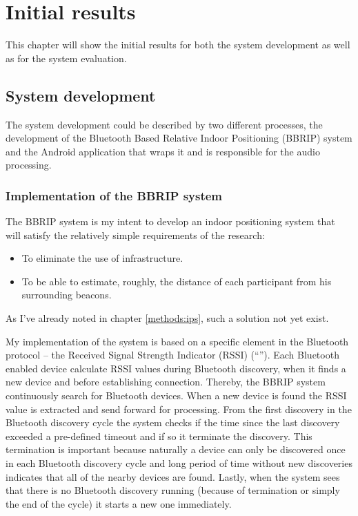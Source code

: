 \section{Initial results}

This chapter will show the initial results for both the system development as well as for the system evaluation.

\subsection{System development}

The system development could be described by two different processes, the development of the Bluetooth Based Relative Indoor Positioning (BBRIP) system and the Android application that wraps it and is responsible for the audio processing.

\subsubsection{Implementation of the BBRIP system}

The BBRIP system is my intent to develop an indoor positioning system that will satisfy the relatively simple requirements of the research:
\begin{itemize}
	\item To eliminate the use of infrastructure.
	\item To be able to estimate, roughly, the distance of each participant from his surrounding beacons.
\end{itemize}

As I've already noted in chapter \ref{methods:ips}, such a solution not yet exist.

My implementation of the system is based on a specific element in the Bluetooth protocol -- the Received Signal Strength Indicator (RSSI) (``''). Each Bluetooth enabled device calculate RSSI values during Bluetooth discovery, when it finds a new device and before establishing connection. Thereby, the BBRIP system continuously search for Bluetooth devices. When a new device is found the RSSI value is extracted and send forward for processing. From the first discovery in the Bluetooth discovery cycle the system checks if the time since the last discovery exceeded a pre-defined timeout and if so it terminate the discovery. This termination is important because naturally a device can only be discovered once in each Bluetooth discovery cycle and long period of time without new discoveries indicates that all of the nearby devices are found. Lastly, when the system sees that there is no Bluetooth discovery running (because of termination or simply the end of the cycle) it starts a new one immediately.

